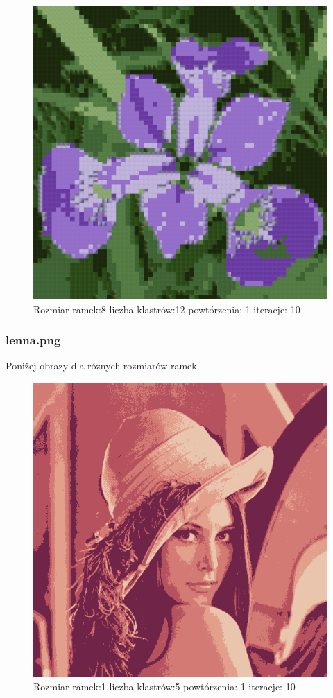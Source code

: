 \documentclass{classrep}
\begin{document}
{{{{\begin{figure}[!htbp]
\centering
\includegraphics[width=\textwidth,width=90mm]{obrazy/iris_R8_K12_P1_It10.png}
\caption{Rozmiar ramek:8 liczba klastrów:12 powtórzenia: 1 iteracje: 10 }
\end{figure}
\FloatBarrier
}

\subsubsection{lenna.png}
{
Poniżej obrazy dla róznych rozmiarów ramek
\begin{figure}[!htbp]
\centering
\includegraphics[width=\textwidth,width=90mm]{obrazy/lenna_R1_K5_P1_It10.png}
\caption{Rozmiar ramek:1 liczba klastrów:5 powtórzenia: 1 iteracje: 10 }
\end{figure}

}}}}
\end{document}
